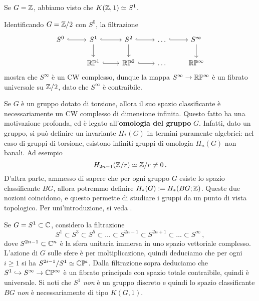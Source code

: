 \begin{ex}
	\begin{rmnumerate}
		\item Se $G={\mathbb Z}$, abbiamo visto che $K({\mathbb Z},1) \simeq S^{1}$.
		
		\item Identificando $G = {\mathbb Z}/2$ con $S^{0}$, la filtrazione
		\begin{equation*}
			\begin{tikzcd}
				S^{0} \ar[r, hook]
				& S^{1} \ar[r, hook] \ar[d]
				& S^{2} \ar[r, hook] \ar[d]
				& \dots \ar[r, hook]
				& S^{\infty} \ar[d] \\
				& \R\PP^{1} \ar[r, hook]
				& \R\PP^{2} \ar[r, hook]
				& \dots
				& \R\PP^{\infty}
			\end{tikzcd}
		\end{equation*}
		mostra che $S^{\infty}$ è un CW complesso,
		dunque la mappa $S^{\infty} \to {\mathbb R}\mathbb{P}^{\infty}$ è un fibrato universale su ${\mathbb Z}/2$,
		dato che $S^{\infty}$ è contraibile.
		
		\begin{fact}
			Se $G$ è un gruppo dotato di torsione, allora il suo spazio classificante
			è necessariamente un CW complesso di dimensione infinita.
			Questo fatto ha una motivazione profonda,
			ed è legato all'\textbf{omologia del gruppo} $G$.
			Infatti, dato un gruppo, si può definire un invariante 
			$H_{*}(G)$ in termini puramente algebrici:
			 nel caso di gruppi di torsione, esistono infiniti
			 gruppi di omologia $H_{n}(G)$ non banali.
			Ad esempio
			\begin{equation*}
				H_{2n-1}({\mathbb Z}/r) \simeq {\mathbb Z}/r \ne 0\,.
			\end{equation*}
			D'altra parte, ammesso di sapere che per ogni gruppo $G$
			esiste lo spazio classificante $BG$,
			allora potremmo definire $H_{*}(G) := H_{*}(BG;{\mathbb Z})$.
			Queste due nozioni coincidono, e questo permette
			di studiare i gruppi da un punto di vista topologico.
			Per uni'introduzione, si veda .
		\end{fact}
		
		\item Se $G = S^{1} \subset \mathbb{C}$, considero la filtrazione
		\begin{equation*}
			S^{1} \subset S^{3} \subset S^{5} \subset \dots 
			\subset S^{2n-1} \subset S^{2n+1} \subset
			\dots \subset S^{\infty}\,,
		\end{equation*}
		dove $S^{2n-1} \subset \mathbb{C}^{n}$ è la sfera unitaria immersa in uno spazio vettoriale complesso.
		L'azione di $G$ sulle sfere è per moltiplicazione, quindi deduciamo che
		per ogni $i \ge 1$ si ha $S^{2i-1} / S^{1} \simeq \mathbb{C}\mathbb{P}^{i}$.
		Dalla filtrazione sopra deduciamo che 
		$S^{1} \hookrightarrow S^{\infty}  \to \mathbb{C}\mathbb{P}^{\infty}$ 
		è un fibrato principale con spazio totale contraibile,
		quindi è universale.
		Si noti che $S^{1}$ \emph{non} è un gruppo discreto e 
		quindi lo spazio classificante $BG$ \emph{non} è necessariamente 
		di tipo $K(G,1)$.
	\end{rmnumerate}
\end{ex}

